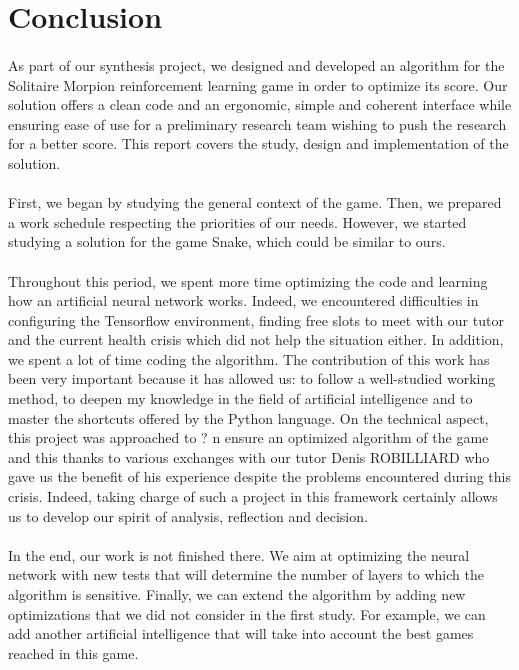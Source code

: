 \documentclass{article}
\begin{document}
\section{Conclusion}
\paragraph{}
\setlength{\parindent}{2cm}
As part of our synthesis project, we designed and developed an algorithm for the Solitaire Morpion reinforcement learning game in order to optimize its score. Our solution offers a clean code and an ergonomic, simple and coherent interface while ensuring ease of use for a preliminary research team wishing to push the research for a better score. This report covers the study, design and implementation of the solution.
\paragraph{}
\setlength{\parindent}{2cm}
First, we began by studying the general context of the game. Then, we prepared a work schedule respecting the priorities of our needs. However, we started studying a solution for the game Snake, which could be similar to ours.
\paragraph{}
\setlength{\parindent}{2cm}
Throughout this period, we spent more time optimizing the code and learning how an artificial neural network works. Indeed, we encountered difficulties in configuring the Tensorflow environment, finding free slots to meet with our tutor and the current health crisis which did not help the situation either. In addition, we spent a lot of time coding the algorithm. The contribution of this work has been very important because it has allowed us: to follow a well-studied working method, to deepen my knowledge in the field of artificial intelligence and to master the shortcuts offered by the Python language. On the technical aspect, this project was approached to ? n ensure an optimized algorithm of the game and this thanks to various exchanges with our tutor Denis ROBILLIARD who gave us the benefit of his experience despite the problems encountered during this crisis. Indeed, taking charge of such a project in this framework certainly allows us to develop our spirit of analysis, reflection and decision.
\paragraph{}
\setlength{\parindent}{2cm}
In the end, our work is not finished there. We aim at optimizing the neural network with new tests that will determine the number of layers to which the algorithm is sensitive. Finally, we can extend the algorithm by adding new optimizations that we did not consider in the first study. For example, we can add another artificial intelligence that will take into account the best games reached in this game.
\newpage


\end{document}
